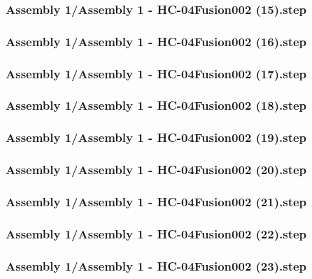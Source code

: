 \documentclass[a4paper,12pt]{article}
\begin{document}
\begin{lstlising}[language=C++]
\subsubsection{Assembly 1/Assembly 1 - HC-04Fusion002 (15).step}

\subsubsection{Assembly 1/Assembly 1 - HC-04Fusion002 (16).step}

\subsubsection{Assembly 1/Assembly 1 - HC-04Fusion002 (17).step}

\subsubsection{Assembly 1/Assembly 1 - HC-04Fusion002 (18).step}

\subsubsection{Assembly 1/Assembly 1 - HC-04Fusion002 (19).step}

\subsubsection{Assembly 1/Assembly 1 - HC-04Fusion002 (20).step}

\subsubsection{Assembly 1/Assembly 1 - HC-04Fusion002 (21).step}

\subsubsection{Assembly 1/Assembly 1 - HC-04Fusion002 (22).step}

\subsubsection{Assembly 1/Assembly 1 - HC-04Fusion002 (23).step}


\end{lstlising}
\end{document}

